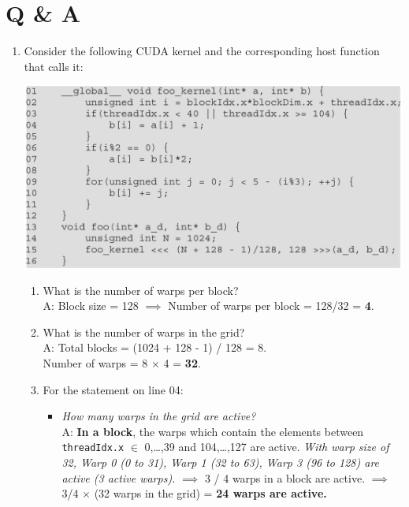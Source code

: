 \section{Q \& A}
\begin{enumerate}
    \item Consider the following CUDA kernel and the corresponding host function that calls it:
          \begin{center}
              \includegraphics[width=0.7\linewidth]{Images/CompArch/qa1.png}
          \end{center}
          \begin{enumerate}
              \item What is the number of warps per block?\\
                    A: Block size = 128 $\implies$ Number of warps per block = 128/32 =\textbf{ 4}.
              \item What is the number of warps in the grid?\\
                    A: Total blocks = (1024 + 128 - 1) / 128 = 8.\\
                    Number of warps = 8 $\times$ 4 = \textbf{32}.
              \item For the statement on line 04:
                    \begin{itemize}
                        \item \textsl{How many warps in the grid are active?}
                              \\A: \textbf{In a block}, the warps which contain the elements between \texttt{threadIdx.x} $\in$ {{0,\dots,39} and {104,\dots,127}} are active. \textit{With warp size of 32, Warp 0 (0 to 31), Warp 1 (32 to 63), Warp 3 (96 to 128) are active (3 active warps).} $\implies$ 3 / 4 warps in a block are active. $\implies$ 3/4 $\times$ (32 warps in the grid) = \textbf{24 warps are active.}


\end{itemize}
\end{enumerate}
\end{enumerate}
